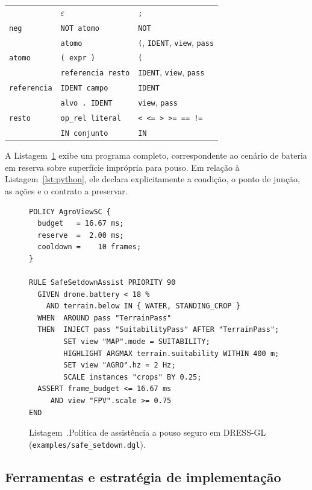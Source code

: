 \documentclass[conference]{IEEEtran}
\renewcommand{\lstlistingname}{Listagem}
\newenvironment{blocolstflut}[1][tbp]%
  {\begin{figure}[#1]\noindent\begin{minipage}{\columnwidth}}%
  {\end{minipage}\end{figure}}
\newcommand{\legendalst}[2]{%
  \par\vspace{2pt}%
  \refstepcounter{lstlisting}\label{#1}%
  {\footnotesize\lstlistingname~\thelstlisting.\enspace #2\par}}
\begin{document}
\begin{table}[htbp]
\begin{tabularx}{\columnwidth}{@{}l >{\raggedright\arraybackslash}p{} L@{}}
                    & $\varepsilon$ & \texttt{;} \\
\addlinespace
\texttt{neg}        & \texttt{NOT atomo} & \texttt{NOT} \\
                    & \texttt{atomo} & \texttt{(}, \texttt{IDENT}, \texttt{view}, \texttt{pass} \\
\texttt{atomo}      & \texttt{( expr )} & \texttt{(} \\
                    & \texttt{referencia resto} & \texttt{IDENT}, \texttt{view}, \texttt{pass} \\
\texttt{referencia} & \texttt{IDENT campo} & \texttt{IDENT} \\
                    & \texttt{alvo . IDENT} & \texttt{view}, \texttt{pass} \\
\texttt{resto}      & \texttt{op\_rel literal} & \texttt{< <= > >= == !=} \\
                    & \texttt{IN conjunto} & \texttt{IN} \\
\bottomrule
\end{tabularx}
\end{table}

A Listagem~\ref{lst:exemplo} exibe um programa completo, correspondente ao
cenário de bateria em reserva sobre superfície imprópria para pouso. Em relação
à Listagem~\ref{lst:python}, ele declara explicitamente a condição, o ponto de
junção, as ações e o contrato a preservar.

\begin{blocolstflut}
\begin{lstlisting}[style=dsl]
POLICY AgroViewSC {
  budget   = 16.67 ms;
  reserve  =  2.00 ms;
  cooldown =    10 frames;
}

RULE SafeSetdownAssist PRIORITY 90
  GIVEN drone.battery < 18 %
    AND terrain.below IN { WATER, STANDING_CROP }
  WHEN  AROUND pass "TerrainPass"
  THEN  INJECT pass "SuitabilityPass" AFTER "TerrainPass";
        SET view "MAP".mode = SUITABILITY;
        HIGHLIGHT ARGMAX terrain.suitability WITHIN 400 m;
        SET view "AGRO".hz = 2 Hz;
        SCALE instances "crops" BY 0.25;
  ASSERT frame_budget <= 16.67 ms
     AND view "FPV".scale >= 0.75
END
\end{lstlisting}
\legendalst{lst:exemplo}{Política de assistência a pouso seguro em DRESS-GL
(\texttt{examples/\allowbreak safe\_setdown.dgl}).}
\end{blocolstflut}

\subsection{Ferramentas e estratégia de implementação}
\label{sec:ferramentas}
\end{document}
